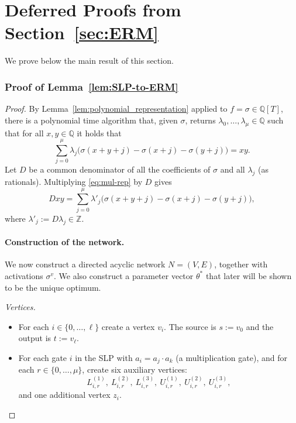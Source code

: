 \documentclass{article}
\newcommand{\Q}{\mathbb{Q}}
\theoremstyle{plain}
\theoremstyle{definition}
\theoremstyle{remark}
\begin{document}
\section{Deferred Proofs from Section~\ref{sec:ERM}}
\label{sec:omited_3}
We prove below the main result of this section. 

\subsubsection*{Proof of Lemma~\ref{lem:SLP-to-ERM}}
\begin{proof}
	By Lemma~\ref{lem:polynomial_representation} applied to
	$f=\sigma\in\mathbb{Q}[T]$, there is a polynomial time algorithm that, given $\sigma$, returns $\lambda_0,\dots,\lambda_{\mu}\in\Q$
	such that for all $x,y\in\mathbb{Q}$ it holds that
	\begin{equation}
		\label{eq:mul-rep}
		\sum_{j=0}^{\mu} \lambda_j\bigl(
		\sigma(x+y+j) - \sigma(x+j) - \sigma(y+j)
		\bigr) = xy.
	\end{equation}
	Let $D$ be a common denominator of all the coefficients of $\sigma$ and
	all $\lambda_j$ (as rationals). Multiplying \eqref{eq:mul-rep} by $D$
	gives
	\begin{equation}
		\label{eq:mul-rep-int}
		D x y
		= \sum_{j=0}^{\mu} \lambda'_j\bigl(
		\sigma(x+y+j) - \sigma(x+j) - \sigma(y+j)
		\bigr),
	\end{equation}
	where $\lambda'_j := D\lambda_j\in\mathbb{Z}$.
	
	
	\paragraph{Construction of the network.}
	We now construct a directed acyclic network $N=(V,E)$, together with activations $\sigma^v$. We also construct a
	parameter vector $\theta^\ast$ that later will be shown to be the unique optimum. 
	
	\smallskip
	\noindent
	\textit{Vertices.}
	\begin{itemize}
		\item For each $i\in\{0,\dots,\ell\}$ create a vertex $v_i$. The source
		is $s:=v_0$ and the output is $t:=v_\ell$.
		\item For each gate $i$ in the SLP with $a_i = a_j \cdot a_k$ (a
		multiplication gate), and for each $r\in\{0,\dots,{\mu}\}$, create
		six auxiliary vertices:
		\[
		L^{(1)}_{i,r},\ L^{(2)}_{i,r},\ L^{(3)}_{i,r},\
		U^{(1)}_{i,r},\ U^{(2)}_{i,r},\ U^{(3)}_{i,r},
		\]
		and one additional vertex $z_i$.
	\end{itemize}
	

\end{proof}
\end{document}
